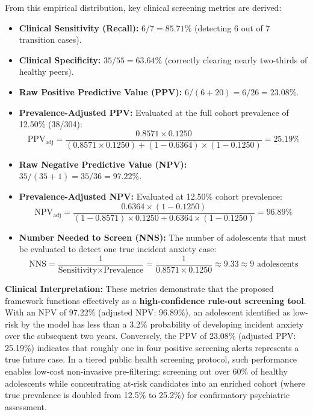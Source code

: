 \documentclass[10pt,letterpaper]{article}
\begin{document}
From this empirical distribution, key clinical screening metrics are derived:
\begin{itemize}
    \item \textbf{Clinical Sensitivity (Recall):} $6 / 7 = 85.71\%$ (detecting 6 out of 7 transition cases).
    \item \textbf{Clinical Specificity:} $35 / 55 = 63.64\%$ (correctly clearing nearly two-thirds of healthy peers).
    \item \textbf{Raw Positive Predictive Value (PPV):} $6 / (6 + 20) = 6 / 26 = 23.08\%$.
    \item \textbf{Prevalence-Adjusted PPV:} Evaluated at the full cohort prevalence of 12.50\% (38/304):
    \begin{equation} \label{eq:adj_ppv}
    \text{PPV}_{\text{adj}} = \frac{0.8571 \times 0.1250}{(0.8571 \times 0.1250) + (1 - 0.6364) \times (1 - 0.1250)} = 25.19\%
    \end{equation}
    \item \textbf{Raw Negative Predictive Value (NPV):} $35 / (35 + 1) = 35 / 36 = 97.22\%$.
    \item \textbf{Prevalence-Adjusted NPV:} Evaluated at 12.50\% cohort prevalence:
    \begin{equation} \label{eq:adj_npv}
    \text{NPV}_{\text{adj}} = \frac{0.6364 \times (1 - 0.1250)}{(1 - 0.8571) \times 0.1250 + 0.6364 \times (1 - 0.1250)} = 96.89\%
    \end{equation}
    \item \textbf{Number Needed to Screen (NNS):} The number of adolescents that must be evaluated to detect one true incident anxiety case:
    \begin{equation} \label{eq:nns}
    \text{NNS} = \frac{1}{\text{Sensitivity} \times \text{Prevalence}} = \frac{1}{0.8571 \times 0.1250} \approx 9.33 \approx 9 \text{ adolescents}
    \end{equation}
\end{itemize}

\textbf{Clinical Interpretation:} These metrics demonstrate that the proposed framework functions effectively as a \textbf{high-confidence rule-out screening tool}. With an NPV of 97.22\% (adjusted NPV: 96.89\%), an adolescent identified as low-risk by the model has less than a 3.2\% probability of developing incident anxiety over the subsequent two years. Conversely, the PPV of 23.08\% (adjusted PPV: 25.19\%) indicates that roughly one in four positive screening alerts represents a true future case. In a tiered public health screening protocol, such performance enables low-cost non-invasive pre-filtering: screening out over 60\% of healthy adolescents while concentrating at-risk candidates into an enriched cohort (where true prevalence is doubled from 12.5\% to 25.2\%) for confirmatory psychiatric assessment.
\end{document}
